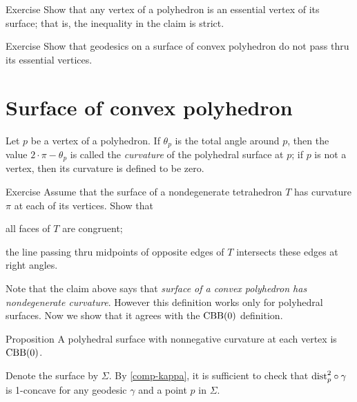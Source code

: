 \begin{thm}{Exercise}\label{ex:vertex-essential-vertex}
Show that any vertex of a polyhedron is an essential vertex of its surface;
that is, the inequality in the claim is strict.
\end{thm}


\begin{thm}{Exercise}\label{ex:geodesic-vertex}
Show that geodesics on a surface of convex polyhedron do not pass thru its essential vertices.
\end{thm}

\section{Surface of convex polyhedron}

Let $p$ be a vertex of a polyhedron.
If $\theta_p$ is the total angle around $p$, then the value $2\cdot \pi -\theta_p$ is called the \emph{curvature} of the polyhedral surface at $p$;
if $p$ is not a vertex, then its curvature is defined to be zero.

\begin{thm}{Exercise}\label{pr:tetrahedron} 
Assume that the surface of a nondegenerate tetrahedron $T$ has curvature $\pi$ at each of its vertices.
Show that 

\begin{subthm}{}
all faces of $T$ are congruent; 
\end{subthm}

\begin{subthm}{} the line passing thru midpoints of opposite edges of $T$ intersects these edges at right angles.
\end{subthm}
 
\end{thm}

Note that the claim above says that \textit{surface of a convex polyhedron has nondegenerate curvature}.
However this definition works only for polyhedral surfaces.
Now we show that it agrees with the $\mathrm{CBB}(0)$ definition.

\begin{thm}{Proposition}\label{prop:poly-CBB}
A polyhedral surface with nonnegative curvature at each vertex is $\mathrm{CBB}(0)$.
\end{thm}

Denote the surface by $\Sigma$.
By \ref{comp-kappa}, it is sufficient to check that 
$\mathrm{dist}_p^2\circ\gamma$ is 1-concave for any geodesic $\gamma$ and a point $p$ in $\Sigma$.

